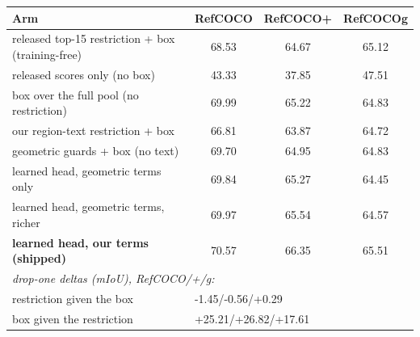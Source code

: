 \begin{tabular}{lccc}
\toprule
Arm & RefCOCO & RefCOCO+ & RefCOCOg \\
\midrule
released top-15 restriction + box (training-free) & 68.53 & 64.67 & 65.12 \\
released scores only (no box) & 43.33 & 37.85 & 47.51 \\
box over the full pool (no restriction) & 69.99 & 65.22 & 64.83 \\
our region-text restriction + box & 66.81 & 63.87 & 64.72 \\
geometric guards + box (no text) & 69.70 & 64.95 & 64.83 \\
learned head, geometric terms only & 69.84 & 65.27 & 64.45 \\
learned head, geometric terms, richer & 69.97 & 65.54 & 64.57 \\
\textbf{learned head, our terms (shipped)} & 70.57 & 66.35 & 65.51 \\
\midrule
\multicolumn{4}{l}{\emph{drop-one deltas (mIoU), RefCOCO/+/g:}} \\
restriction given the box & \multicolumn{3}{l}{-1.45/-0.56/+0.29} \\
box given the restriction & \multicolumn{3}{l}{+25.21/+26.82/+17.61} \\
\bottomrule
\end{tabular}

